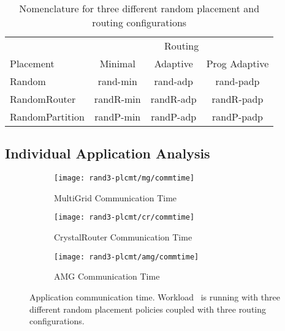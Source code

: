\begin{table}[ht]
\begin{center}
\caption{Nomenclature for three different random placement and routing configurations} 
\label{tab: placement routing configs}
\begin{tabular}{l c c c }
\toprule %
\toprule
&\multicolumn{3}{c}{Routing } \\ 
\cmidrule(l){2-4}
Placement  & Minimal & Adaptive & Prog Adaptive\\ %
\midrule
Random &   rand-min  &   rand-adp   &  rand-padp   \\ 
\midrule %
RandomRouter &   randR-min  &   randR-adp   &  randR-padp   \\
\midrule
RandomPartition &   randP-min  &   randP-adp   &  randP-padp   \\ 
\midrule %
\bottomrule %
\end{tabular}
\end{center}
\end{table}



\subsection{Individual Application Analysis}
\label{sec:rand3-plcmnt-app-study}

\begin{figure*}[t!]
    \centering
    \begin{subfigure}[t]{0.32\textwidth}
        \centering
        \texttt{[image: rand3-plcmt/mg/commtime]}
        \caption{MultiGrid Communication Time}
        \label{fig:rand3-plcmt-mg-commtime}
    \end{subfigure}
    \begin{subfigure}[t]{0.32\textwidth}
        \centering
        \texttt{[image: rand3-plcmt/cr/commtime]}
        \caption{CrystalRouter Communication Time}
        \label{fig:rand3-plcmt-cr-commtime}
    \end{subfigure}
    \begin{subfigure}[t]{0.32\textwidth}
        \centering
        \texttt{[image: rand3-plcmt/amg/commtime]}
        \caption{AMG Communication Time}
        \label{fig:rand3-plcmt-amg-commtime}
    \end{subfigure}
   \caption{Application communication time. Workload~ is running with three different random placement policies coupled with three routing configurations.}
   \label{fig:rand3-plcmt-apps-commtime}
\end{figure*}

